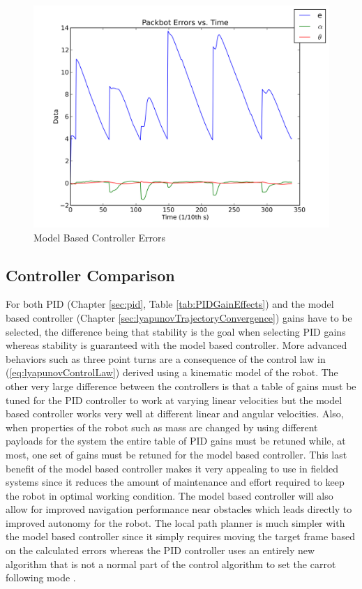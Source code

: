 \begin{figure}[ht!]
	\centering
	\includegraphics[width=.5\textwidth]{images/pbtx/20110113_1451_pbtx_simpleDriveErrors}
	\caption{Model Based Controller Errors}
	\label{fig:mbErrors}
\end{figure}

\subsection{Controller Comparison}
\label{sec:controllerComparison}
For both PID (Chapter \ref{sec:pid}, Table \ref{tab:PIDGainEffects}) and the model based controller (Chapter \ref{sec:lyapunovTrajectoryConvergence}) gains have to be selected, the difference being that stability is the goal when selecting PID gains whereas stability is guaranteed with the model based controller. More advanced behaviors such as three point turns are a consequence of the control law in (\ref{eq:lyapunovControlLaw}) derived using a kinematic model of the robot. The other very large difference between the controllers is that a table of gains must be tuned for the PID controller to work at varying linear velocities but the model based controller works very well at different linear and angular velocities. Also, when properties of the robot such as mass are changed by using different payloads for the system the entire table of PID gains must be retuned while, at most, one set of gains must be retuned for the model based controller. This last benefit of the model based controller makes it very appealing to use in fielded systems since it reduces the amount of maintenance and effort required to keep the robot in optimal working condition. The model based controller will also allow for improved navigation performance near obstacles which leads directly to improved autonomy for the robot. The local path planner is much simpler with the model based controller since it simply requires moving the target frame based on the calculated errors whereas the PID controller uses an entirely new algorithm that is not a normal part of the control algorithm to set the carrot following mode \cite{Hogg02}.

